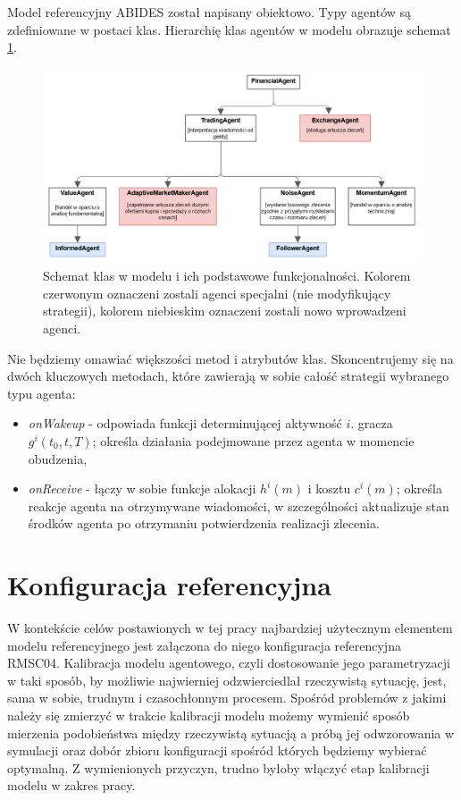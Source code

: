 Model referencyjny ABIDES został napisany obiektowo. Typy agentów są zdefiniowane w postaci klas. Hierarchię klas agentów w modelu obrazuje schemat \ref{fig:classdiagram}. 
\begin{center}
\begin{figure}
\begin{center}
\includegraphics[scale=0.7]{schemat_klas_2.png}
\end{center}
\caption{Schemat klas w modelu i ich podstawowe funkcjonalności. Kolorem czerwonym oznaczeni zostali agenci specjalni (nie modyfikujący strategii), kolorem niebieskim oznaczeni zostali nowo wprowadzeni agenci.}\label{fig:classdiagram}
\end{figure}
\end{center}
Nie będziemy omawiać większości metod i atrybutów klas. Skoncentrujemy się na dwóch kluczowych metodach, które zawierają w sobie całość strategii wybranego typu agenta:
\begin{itemize}
\item \textit{onWakeup} - odpowiada funkcji determinującej aktywność $i.$ gracza $g^i(t_0,t,T)$; określa działania podejmowane przez agenta w momencie obudzenia,
\item \textit{onReceive} - łączy w sobie funkcje alokacji $h^i(m)$ i kosztu $c^i(m)$; określa reakcje agenta na otrzymywane wiadomości, w szczególności aktualizuje stan środków agenta po otrzymaniu potwierdzenia realizacji zlecenia.
\end{itemize}


\section{Konfiguracja referencyjna}

W kontekście celów postawionych w tej pracy najbardziej użytecznym elementem modelu referencyjnego jest załączona do niego konfiguracja referencyjna RMSC04. Kalibracja modelu agentowego, czyli dostosowanie jego parametryzacji w taki sposób, by możliwie najwierniej odzwierciedlał rzeczywistą sytuację, jest, sama w sobie, trudnym i czasochłonnym procesem. Spośród problemów z jakimi należy się zmierzyć w trakcie kalibracji modelu możemy wymienić sposób mierzenia podobieństwa między rzeczywistą sytuacją a próbą jej odwzorowania w symulacji oraz dobór zbioru konfiguracji spośród których będziemy wybierać optymalną. Z wymienionych przyczyn, trudno byłoby włączyć etap kalibracji modelu w zakres pracy. 

